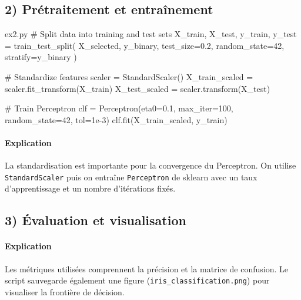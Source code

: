 \documentclass[12pt,a4paper]{article}
\begin{document}

\subsection*{2) Prétraitement et entraînement}

\begin{codeholder}{ex2.py}
# Split data into training and test sets
X_train, X_test, y_train, y_test = train_test_split(
    X_selected, y_binary,
    test_size=0.2, random_state=42, stratify=y_binary
)

# Standardize features
scaler         = StandardScaler()
X_train_scaled = scaler.fit_transform(X_train)
X_test_scaled  = scaler.transform(X_test)

# Train Perceptron
clf = Perceptron(eta0=0.1, max_iter=100, random_state=42, tol=1e-3)
clf.fit(X_train_scaled, y_train)
\end{codeholder}

\paragraph{Explication}
La standardisation est importante pour la convergence du Perceptron.
On utilise \texttt{StandardScaler} puis on entraîne \texttt{Perceptron}
de sklearn avec un taux d'apprentissage et un nombre d'itérations fixés.


\subsection*{3) Évaluation et visualisation}


\paragraph{Explication}
Les métriques utilisées comprennent la précision et la matrice de confusion.
Le script sauvegarde également une figure (\texttt{iris\_classification.png})
pour visualiser la frontière de décision.
\end{document}
